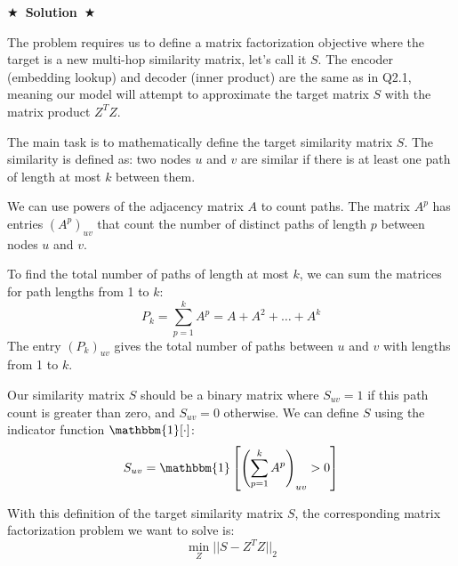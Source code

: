 \documentclass{article}
\numberwithin{figure}{section}
\newcommand{\Solution}[1]{%
	{%
		\medskip
		\color{red}
		\bf $\bigstar$~\sf\textbf{Solution}~$\bigstar$ \sf
		#1
	}
	\bigskip
}
\begin{document}
	\Solution{
		The problem requires us to define a matrix factorization objective where the target is a new multi-hop similarity matrix, let's call it $S$. The encoder (embedding lookup) and decoder (inner product) are the same as in Q2.1, meaning our model will attempt to approximate the target matrix $S$ with the matrix product $Z^TZ$.
		
		The main task is to mathematically define the target similarity matrix $S$. The similarity is defined as: two nodes $u$ and $v$ are similar if there is at least one path of length at most $k$ between them.
		
		We can use powers of the adjacency matrix $A$ to count paths. The matrix $A^p$ has entries $(A^p)_{uv}$ that count the number of distinct paths of length $p$ between nodes $u$ and $v$.
		
		To find the total number of paths of length at most $k$, we can sum the matrices for path lengths from 1 to $k$:
		\[ P_k = \sum_{p=1}^{k} A^p = A + A^2 + \dots + A^k \]
		The entry $(P_k)_{uv}$ gives the total number of paths between $u$ and $v$ with lengths from 1 to $k$.
		
		Our similarity matrix $S$ should be a binary matrix where $S_{uv}=1$ if this path count is greater than zero, and $S_{uv}=0$ otherwise. We can define $S$ using the indicator function $\mathbbm{1}[\cdot]$:
		\[ S_{uv} = \mathbbm{1}\left[ \left(\sum_{p=1}^{k} A^p\right)_{uv} > 0 \right] \]
		
		With this definition of the target similarity matrix $S$, the corresponding matrix factorization problem we want to solve is:
		\[ \min_Z ||S - Z^TZ||_2 \]
	}
	
\end{document}
